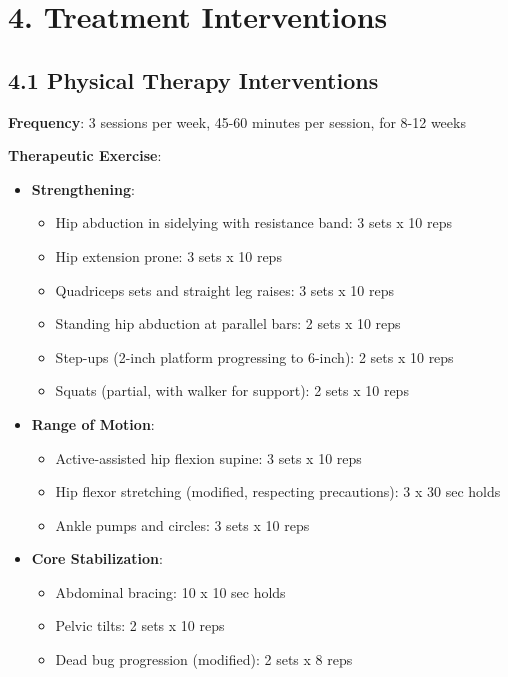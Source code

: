 \documentclass[11pt,letterpaper]{article}
\begin{document}
\section*{4. Treatment Interventions}

\subsection*{4.1 Physical Therapy Interventions}

\textbf{Frequency}: 3 sessions per week, 45-60 minutes per session, for 8-12 weeks

\textbf{Therapeutic Exercise}:
\begin{itemize}[leftmargin=*]
    \item \textbf{Strengthening}:
    \begin{itemize}
        \item Hip abduction in sidelying with resistance band: 3 sets x 10 reps
        \item Hip extension prone: 3 sets x 10 reps
        \item Quadriceps sets and straight leg raises: 3 sets x 10 reps
        \item Standing hip abduction at parallel bars: 2 sets x 10 reps
        \item Step-ups (2-inch platform progressing to 6-inch): 2 sets x 10 reps
        \item Squats (partial, with walker for support): 2 sets x 10 reps
    \end{itemize}
    
    \item \textbf{Range of Motion}:
    \begin{itemize}
        \item Active-assisted hip flexion supine: 3 sets x 10 reps
        \item Hip flexor stretching (modified, respecting precautions): 3 x 30 sec holds
        \item Ankle pumps and circles: 3 sets x 10 reps
    \end{itemize}
    
    \item \textbf{Core Stabilization}:
    \begin{itemize}
        \item Abdominal bracing: 10 x 10 sec holds
        \item Pelvic tilts: 2 sets x 10 reps
        \item Dead bug progression (modified): 2 sets x 8 reps
    \end{itemize}
\end{itemize}
\end{document}
